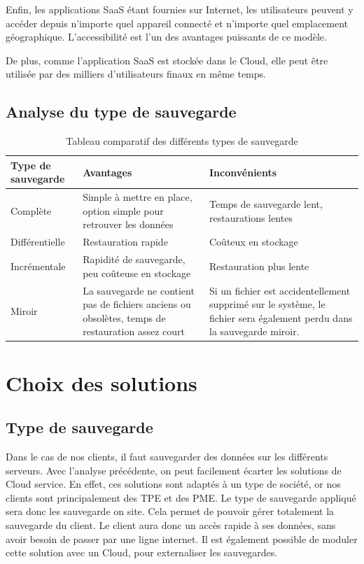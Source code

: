 \documentclass[pfe]{tnreport} %
\begin{document}
Enfin, les applications SaaS étant fournies sur Internet, les utilisateurs peuvent y accéder depuis n'importe quel appareil connecté et n'importe quel emplacement géographique. L'accessibilité est l'un des avantages puissants de ce modèle.

De plus, comme l'application SaaS est stockée dans le Cloud, elle peut être utilisée par des milliers d'utilisateurs finaux en même temps.

\clearpage

\section{Analyse du type de sauvegarde}

\begin{table}[]
    \centering
    \begin{tabular}{|p{4cm}|p{6cm}|p{6cm}|}
    \hline
         Type de sauvegarde & Avantages & Inconvénients\\
         \hline
         Complète & Simple à mettre en place, option simple pour retrouver les données & Temps de sauvegarde lent, restaurations lentes\\
         \hline
         Différentielle & Restauration rapide & Coûteux en stockage \\ 
         \hline
         Incrémentale & Rapidité de sauvegarde, peu coûteuse en stockage & Restauration plus lente  \\
         \hline 
         Miroir & La sauvegarde ne contient pas de fichiers anciens ou obsolètes, temps de restauration assez court & Si un fichier est accidentellement supprimé sur le système, le fichier sera également perdu dans la sauvegarde miroir. \\
         \hline 
    \end{tabular}
    \caption{Tableau comparatif des différents types de sauvegarde}
    \label{tab:comparatif_type}
\end{table}

\clearpage

\chapter{Choix des solutions}

\section{Type de sauvegarde}

Dans le cas de nos clients, il faut sauvegarder des données sur les différents serveurs. \newline
Avec l'analyse précédente, on peut facilement écarter les solutions de Cloud service. En effet, ces solutions sont adaptés à un type de société, or nos clients sont principalement des TPE et des PME.
Le type de sauvegarde appliqué sera donc les sauvegarde on site. Cela permet de pouvoir gérer totalement la sauvegarde du client. Le client aura donc un accès rapide à ses données, sans avoir besoin de passer par une ligne internet. Il est également possible de moduler cette solution avec un Cloud, pour externaliser les sauvegardes.
\end{document}
